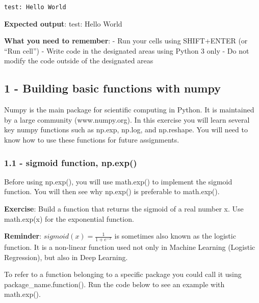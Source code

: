 \documentclass[11pt]{article}
\begin{document}
    \begin{Verbatim}[commandchars=\\\{\}]
test: Hello World

    \end{Verbatim}

    \textbf{Expected output}: test: Hello World

     \textbf{What you need to remember}: - Run your cells using SHIFT+ENTER
(or ``Run cell'') - Write code in the designated areas using Python 3
only - Do not modify the code outside of the designated areas

    \subsection{1 - Building basic functions with
numpy}\label{building-basic-functions-with-numpy}

Numpy is the main package for scientific computing in Python. It is
maintained by a large community (www.numpy.org). In this exercise you
will learn several key numpy functions such as np.exp, np.log, and
np.reshape. You will need to know how to use these functions for future
assignments.

\subsubsection{1.1 - sigmoid function,
np.exp()}\label{sigmoid-function-np.exp}

Before using np.exp(), you will use math.exp() to implement the sigmoid
function. You will then see why np.exp() is preferable to math.exp().

\textbf{Exercise}: Build a function that returns the sigmoid of a real
number x. Use math.exp(x) for the exponential function.

\textbf{Reminder}: $sigmoid(x) = \frac{1}{1+e^{-x}}$ is sometimes also
known as the logistic function. It is a non-linear function used not
only in Machine Learning (Logistic Regression), but also in Deep
Learning.

To refer to a function belonging to a specific package you could call it
using package\_name.function(). Run the code below to see an example
with math.exp().
\end{document}
